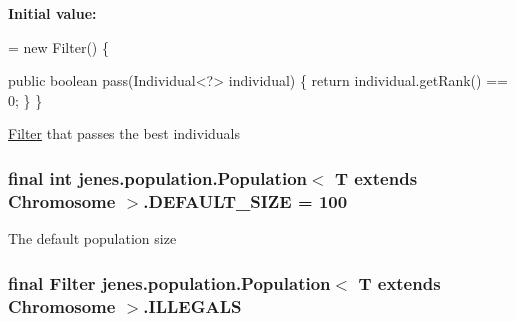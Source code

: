 {\bfseries Initial value\-:}
\begin{DoxyCode}
= \textcolor{keyword}{new} Filter() \{

        \textcolor{keyword}{public} \textcolor{keywordtype}{boolean} pass(Individual<?> individual) \{
            \textcolor{keywordflow}{return} individual.getRank() == 0;
        \}
    \}
\end{DoxyCode}
\hyperlink{interfacejenes_1_1population_1_1_population_3_01_t_01extends_01_chromosome_01_4_1_1_filter}{Filter} that passes the best individuals \hypertarget{classjenes_1_1population_1_1_population_3_01_t_01extends_01_chromosome_01_4_aada0b23838115e85378efcd67c1904e3}{
\subsubsection[{D\-E\-F\-A\-U\-L\-T\-\_\-\-S\-I\-Z\-E}]{\setlength{\rightskip}{0pt plus 5cm}final int jenes.\-population.\-Population$<$ T extends Chromosome $>$.D\-E\-F\-A\-U\-L\-T\-\_\-\-S\-I\-Z\-E = 100\hspace{0.3cm}{\ttfamily [static]}}}\label{classjenes_1_1population_1_1_population_3_01_t_01extends_01_chromosome_01_4_aada0b23838115e85378efcd67c1904e3}
The default population size \hypertarget{classjenes_1_1population_1_1_population_3_01_t_01extends_01_chromosome_01_4_acbb46d951b86374304f72246d3142bce}{
\subsubsection[{I\-L\-L\-E\-G\-A\-L\-S}]{\setlength{\rightskip}{0pt plus 5cm}final Filter jenes.\-population.\-Population$<$ T extends Chromosome $>$.I\-L\-L\-E\-G\-A\-L\-S\hspace{0.3cm}{\ttfamily [static]}}}\label{classjenes_1_1population_1_1_population_3_01_t_01extends_01_chromosome_01_4_acbb46d951b86374304f72246d3142bce}

